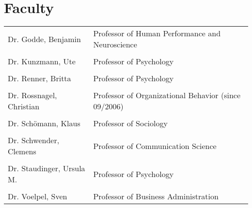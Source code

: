 \section{Faculty} 

\begin{tabular}{ll}
Dr. Godde, Benjamin	& Professor of Human Performance and Neuroscience\\
& \\
Dr. Kunzmann, Ute			& Professor of Psychology\\
& \\
Dr. Renner, Britta		&	Professor of Psychology\\
& \\
Dr. Rossnagel, Christian	&	Professor of Organizational Behavior (since 09/2006) \\
& \\
Dr. Sch\"omann, Klaus		&	Professor of Sociology\\
& \\
Dr. Schwender, Clemens	&	Professor of Communication Science\\
& \\
Dr. Staudinger, Ursula M.	&	Professor of Psychology\\
& \\
Dr. Voelpel, Sven			& Professor of Business Administration
\end{tabular}
